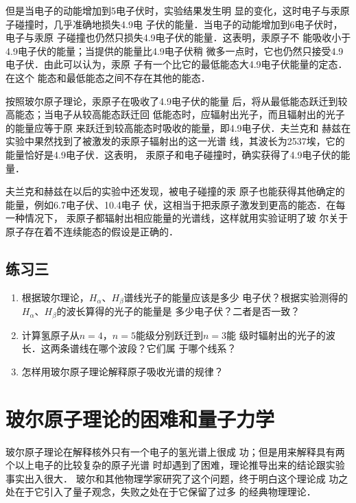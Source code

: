     但是当电子的动能增加到5电子伏时，实验结果发生明
    显的变化，这时电子与汞原子碰撞时，几乎准确地损失4.9电
    子伏的能量．当电子的动能增加到6电子伏时，电子与汞原
    子碰撞也仍然只损失4.9电子伏的能量．这表明，汞原子不
    能吸收小于4.9电子伏的能量；当提供的能量比4.9电子伏稍
    微多一点时，它也仍然只接受4.9电子伏．由此可以认为，汞原
    子有一个比它的最低能态大4.9电子伏能量的定态．在这个
    能态和最低能态之间不存在其他的能态．

    按照玻尔原子理论，汞原子在吸收了4.9电子伏的能量
    后，将从最低能态跃迁到较高能态；当电子从较高能态跃迁回
    低能态时，应辐射出光子，而且辐射出的光子的能量应等于原
    来跃迁到较高能态时吸收的能量，即4.9电子伏．夫兰克和
    赫兹在实验中果然找到了被激发的汞原子辐射出的这一光谱
    线，其波长为2537埃，它的能量恰好是4.9电子伏．这表明，
    汞原子和电子碰撞时，确实获得了4.9电子伏的能量．

    夫兰克和赫兹在以后的实验中还发现，被电子碰撞的汞
    原子也能获得其他确定的能量，例如6.7电子伏、10.4电子
伏，这相当于把汞原子激发到更高的能态．在每一种情况下，
汞原子都辐射出相应能量的光谱线，这样就用实验证明了玻
尔关于原子存在着不连续能态的假设是正确的．


\subsection*{练习三}
\begin{enumerate}
    \item 根据玻尔理论，$H_{\alpha}$、$H_{\beta}$谱线光子的能量应该是多少
电子伏？根据实验测得的$H_{\alpha}$、$H_{\beta}$的波长算得的光子的能量是
多少电子伏？二者是否一致？
\item 计算氢原子从$n=4$，$n=5$能级分别跃迁到$n=3$能
级时辐射出的光子的波长．这两条谱线在哪个波段？它们属
于哪个线系？
\item 怎样用玻尔原子理论解释原子吸收光谱的规律？
\end{enumerate}


\section{玻尔原子理论的困难和量子力学}

玻尔原子理论在解释核外只有一个电子的氢光谱上很成
功；但是用来解释具有两个以上电子的比较复杂的原子光谱
时却遇到了困难，理论推导出来的结论跟实验事实出入很大．
玻尔和其他物理学家研究了这个问题，终于明白这个理论成
功之处在于它引入了量子观念，失败之处在于它保留了过多
的经典物理理论．

